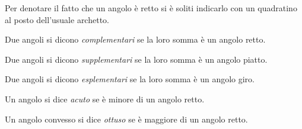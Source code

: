 Per denotare il fatto che un angolo è retto si è soliti indicarlo con 
un quadratino al posto dell'usuale archetto.


\begin{inaccessibleblock}
 \begin{figure}[htb]
\centering
\end{figure}
\end{inaccessibleblock}

\begin{definizione}
Due angoli si dicono \emph{complementari} se la loro somma è un 
angolo retto.
\end{definizione}


\begin{inaccessibleblock}
 \begin{figure}[htb]
\centering
\end{figure}
\end{inaccessibleblock}

\begin{definizione}
Due angoli si dicono \emph{supplementari} se la loro somma è un 
angolo piatto.
\end{definizione}


\begin{inaccessibleblock}
 \begin{figure}[htb]
\centering
\end{figure}
\end{inaccessibleblock}

\begin{definizione}
Due angoli si dicono \emph{esplementari} se la loro somma è un angolo 
giro.
\end{definizione}


\begin{inaccessibleblock}
 \begin{figure}[htb]
\centering
\end{figure}
\end{inaccessibleblock}

\begin{definizione}
Un angolo si dice \emph{acuto} se è minore di un angolo retto.
\end{definizione}

\begin{definizione}
Un angolo convesso si dice \emph{ottuso} se è maggiore di un angolo 
retto.
\end{definizione}


